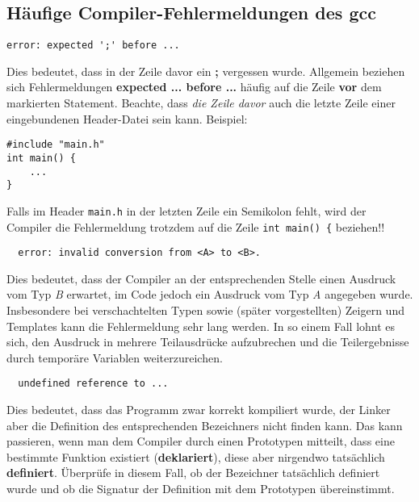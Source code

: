 
\subsection*{Häufige Compiler-Fehlermeldungen des gcc}

\begin{verbatim}
error: expected ';' before ...
\end{verbatim}

Dies bedeutet, dass in der Zeile davor ein \textbf{;} vergessen wurde.
Allgemein beziehen sich Fehlermeldungen \textbf{expected ... before ...} häufig auf die Zeile \textbf{vor} dem markierten Statement.
Beachte, dass \emph{die Zeile davor} auch die letzte Zeile einer eingebundenen Header-Datei sein kann. Beispiel:

\begin{lstlisting}
#include "main.h"
int main() {
	...
}
\end{lstlisting}

Falls im Header \texttt{main.h} in der letzten Zeile ein Semikolon fehlt, wird der Compiler die Fehlermeldung trotzdem auf die Zeile \texttt{int main() \{} beziehen!!

\begin{verbatim}
  error: invalid conversion from <A> to <B>.
\end{verbatim}

Dies bedeutet, dass der Compiler an der entsprechenden Stelle einen Ausdruck vom Typ \emph{B} erwartet, im Code jedoch ein Ausdruck vom Typ \emph{A} angegeben wurde. Insbesondere bei verschachtelten Typen sowie (später vorgestellten) Zeigern und Templates kann die Fehlermeldung sehr lang werden. In so einem Fall lohnt es sich, den Ausdruck in mehrere Teilausdrücke aufzubrechen und die Teilergebnisse durch temporäre Variablen weiterzureichen.

\begin{verbatim}
  undefined reference to ...
\end{verbatim}

Dies bedeutet, dass das Programm zwar korrekt kompiliert wurde, der Linker aber die Definition des entsprechenden Bezeichners nicht finden kann.
Das kann passieren, wenn man dem Compiler durch einen Prototypen mitteilt, dass eine bestimmte Funktion existiert (\textbf{deklariert}), diese aber nirgendwo tatsächlich \textbf{definiert}.
Überprüfe in diesem Fall, ob der Bezeichner tatsächlich definiert wurde und ob die Signatur der Definition mit dem Prototypen übereinstimmt.
